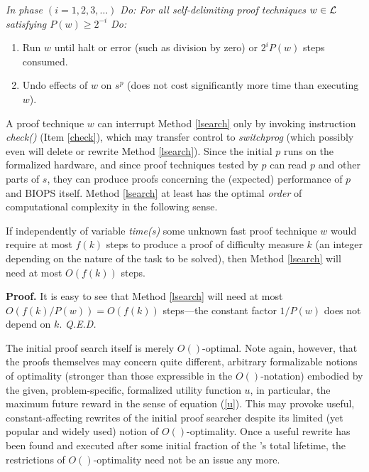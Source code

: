 \begin{method}[BIOPS]
\label{lsearch}
{\em 
In phase $(i=1,2,3, \ldots)$ {\sc Do}:
{\sc For} all self-delimiting \cite{Levin:84} 
proof techniques $w \in \cal L$ satisfying $P(w) \geq 2^{-i}$ {\sc Do}:
\begin{enumerate}
\item
Run $w$ until halt or error (such as 
division by zero) or $2^iP(w)$ steps consumed. 
\item
Undo effects of $w$ on $s^p$
(does not cost significantly more time 
than executing $w$).
\end{enumerate}
}
\end{method}
A proof technique $w$ can interrupt Method \ref{lsearch} 
only by invoking instruction {\em check()} (Item \ref{check}), 
which may transfer
control to {\em switchprog} (which possibly
even will delete or rewrite Method  \ref{lsearch}).
Since the initial $p$ 
runs on the formalized hardware, and since proof techniques
tested by $p$ can read $p$ and other parts of $s$, they
can produce proofs concerning the (expected) 
performance of $p$ and BIOPS itself.
Method \ref{lsearch} at least has the 
optimal {\em order} of computational complexity in the following
sense. 
\begin{theorem}
\label{asopt}
If independently of variable {\em time(s)} some unknown 
fast proof technique $w$
would require at most $f(k)$ steps to produce
a proof of difficulty measure $k$ (an integer depending on
the nature of the task to be solved), then
Method \ref{lsearch}
will need at most $O(f(k))$ steps.
\end{theorem}
{\bf Proof.}
It is easy to see that
Method \ref{lsearch} will need at most $O(f(k)/P(w)) = O(f(k))$
steps---the constant factor  $1/P(w)$ does not depend on $k$.
{\em Q.E.D.}

The initial proof search itself is merely $O()$-optimal.
Note again, however,  that
the proofs themselves may concern quite
different, arbitrary formalizable notions of optimality
(stronger than those expressible in the $O()$-notation)
embodied by the given, problem-specific, formalized 
utility function $u$, in particular, the maximum future
reward in the sense of equation (\ref{u}).
This may provoke useful, constant-affecting rewrites of 
the initial proof searcher despite its limited (yet popular
and widely used) notion of $O()$-optimality.
Once a useful rewrite has been found and executed
after some initial fraction of the \gmn 's total lifetime, the restrictions
of $O()$-optimality need not be an issue any more. 


